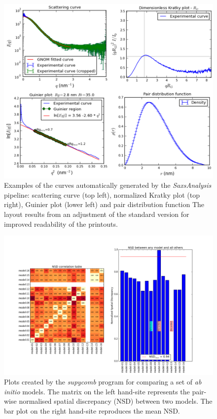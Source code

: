 \documentclass[preprint,pdf]{iucr}              %
\begin{document}
\begin{figure}
\centering
\includegraphics[width=18cm]{autoplot.png}
\caption{Examples of the curves automatically generated by the
\textit{SaxsAnalysis} pipeline: scattering curve (top left), normalized Kratky
plot (top right), Guinier plot (lower left) and pair distribution function
The layout results from an adjustment of the standard version for
improved readability of the printouts.}
\label{plots}
\end{figure}

\begin{figure}
\centering
\includegraphics[width=18cm]{nsd.png}
\caption{Plots created by the \textit{supycomb} program for comparing a set
of \textit{ab initio} models.
The matrix on the left hand-site represents the pair-wise normalised spatial
discrepancy (NSD) between two models.
The bar plot on the right hand-site reproduces the mean NSD.}
\label{fgr:nsd}
\end{figure}
\end{document}
